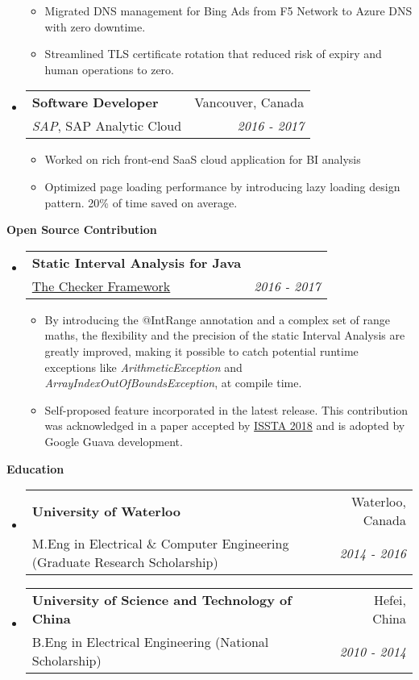 \documentclass[letterpaper,10pt]{article}
\makeatletter
\newcommand{\resitem}[1]{\item #1 \vspace{-2pt}}
\newcommand{\resheading}[1]{{\large \colorbox{mygrey}{\begin{minipage}{\textwidth}{\textbf{#1 \vphantom{p\^{E}}}}\end{minipage}}}}
\newcommand{\ressubheading}[4]{
\begin{tabular*}{7.0in}{l@{\extracolsep{\fill}}r}
    \textbf{#1} & #2 \\
    #3 & \textit{#4} \\
\end{tabular*}\vspace{-6pt}}
\makeatother
\begin{document}
\begin{itemize}
\begin{itemize}
        \resitem{Migrated DNS management for Bing Ads from F5 Network to Azure DNS with zero downtime. }
        \resitem{Streamlined TLS certificate rotation that reduced risk of expiry and human operations to zero. }
	\end{itemize}
\item
    \ressubheading{Software Developer}{Vancouver, Canada}{\textit{SAP}, SAP Analytic Cloud}{2016 - 2017}
    \begin{itemize}
        \resitem{Worked on rich front-end SaaS cloud application for BI analysis}
        \resitem{Optimized page loading performance by introducing lazy loading design pattern. 20\% of time saved on average.}
    \end{itemize}
\end{itemize}

\resheading{Open Source Contribution}
\begin{itemize}
\itemsep0em
\item
	\ressubheading{Static Interval Analysis for Java}{}{\href{https://github.com/typetools/checker-framework}{The Checker Framework}}{2016 - 2017}
	\begin{itemize}
        \resitem{By introducing the @IntRange annotation and a complex set of range maths, the flexibility and the precision of the static Interval Analysis are greatly improved, making it possible to catch potential runtime exceptions like \textit{ArithmeticException} and \textit{ArrayIndexOutOfBoundsException}, at compile time.}
        \resitem{Self-proposed feature incorporated in the latest release. This contribution was acknowledged in a paper accepted by \href{https://homes.cs.washington.edu/~mernst/pubs/array-indexing-issta2018.pdf}{ISSTA 2018} and is adopted by Google Guava development. }
	\end{itemize}
	
\end{itemize}

\resheading{Education}
\begin{itemize}
\itemsep0em
\item
	\ressubheading{University of Waterloo}{Waterloo, Canada}{M.Eng in Electrical \& Computer Engineering (Graduate Research Scholarship)}{2014 - 2016}
	\begin{itemize}
	\end{itemize}
\item
	\ressubheading{University of Science and Technology of China}{Hefei, China}{B.Eng in Electrical Engineering (National Scholarship)}{2010 - 2014}

\end{itemize}
\end{document}
